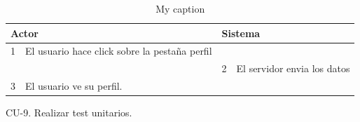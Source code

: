 \begin{itemize}
\begin{itemize}
\begin{table}[H]
\begin{tabularx}{\textwidth}{|l|X|l|X|}
        \multicolumn{2}{|l|}{\cellcolor[HTML]{EFEFEF}Actor} & \multicolumn{2}{l|}{\cellcolor[HTML]{EFEFEF}Sistema} \\ \hline
        1                         & El usuario hace click sobre la pestaña perfil                     &                            &                         \\ \hline
                                  &                         & 2                          & El servidor envia los datos                     \\ \hline
        3                         & El usuario ve su perfil.      &                          &                        \\ \hline
                                  
      \end{tabularx}
      \caption{My caption}
      \label{my-label}
    \end{table}
  \end{itemize}
  \end{itemize}
  \item CU-9. Realizar test unitarios.
